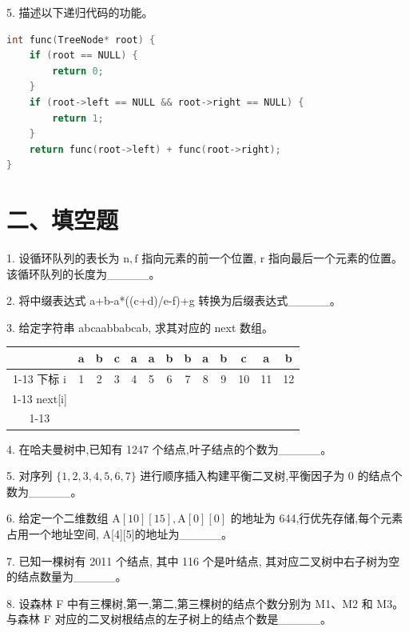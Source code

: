 \newpage

5. 描述以下递归代码的功能。

\begin{lstlisting}[language=C, basicstyle=\ttfamily]
int func(TreeNode* root) {
    if (root == NULL) {
        return 0;
    }
    if (root->left == NULL && root->right == NULL) {
        return 1;
    }
    return func(root->left) + func(root->right);
}
\end{lstlisting}

\section*{二、填空题}

1. 设循环队列的表长为 \(\mathrm{n},\mathrm{f}\) 指向元素的前一个位置, \(\mathrm{r}\) 指向最后一个元素的位置。该循环队列的长度为\_\_\_\_\_。

2. 将中缀表达式 a+b-a*((c+d)/e-f)+g 转换为后缀表达式\_\_\_\_\_。

3. 给定字符串 abcaabbabcab, 求其对应的 next 数组。

\begin{center}
\begin{tabular}{|c|c|c|c|c|c|c|c|c|c|c|c|c|}
\hline
\phantom{X} & \(\mathbf{a}\) & b & c & a & a & b & b & a & b & c & a & b \\
\cline{1-13}
下标 i & 1 & 2 & 3 & 4 & 5 & 6 & 7 & 8 & 9 & 10 & 11 & 12 \\
\cline{1-13}
next[i] & \phantom{X} & \phantom{X} & \phantom{X} & \phantom{X} & \phantom{X} & \phantom{X} & \phantom{X} & \phantom{X} & \phantom{X} & \phantom{X} & \phantom{X} & \phantom{X} \\
\cline{1-13}
\hline
\end{tabular}
\end{center}

4. 在哈夫曼树中,已知有 1247 个结点,叶子结点的个数为\_\_\_\_\_。

5. 对序列 \(\{ 1,2,3,4,5,6,7\}\) 进行顺序插入构建平衡二叉树,平衡因子为 0 的结点个数为\_\_\_\_\_。

6. 给定一个二维数组 \(\mathrm{A}\left\lbrack  {10}\right\rbrack  \left\lbrack  {15}\right\rbrack  ,\mathrm{A}\left\lbrack  0\right\rbrack  \left\lbrack  0\right\rbrack\) 的地址为 644,行优先存储,每个元素占用一个地址空间, A[4][5]的地址为\_\_\_\_\_。

7. 已知一棵树有 2011 个结点, 其中 116 个是叶结点, 其对应二叉树中右子树为空的结点数量为\_\_\_\_\_。

8. 设森林 F 中有三棵树,第一,第二,第三棵树的结点个数分别为 M1、M2 和 M3。 与森林 F 对应的二叉树根结点的左子树上的结点个数是\_\_\_\_\_。

